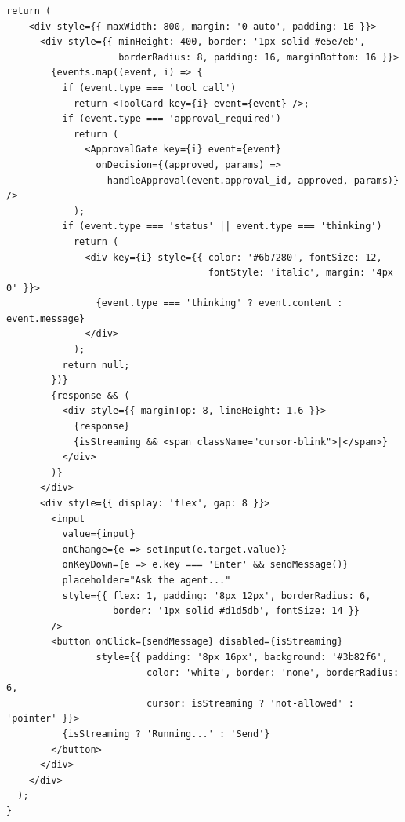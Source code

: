 \begin{lstlisting}[style=pythonstyle, caption={React frontend with streaming tool visualization and approval gates}]
  return (
    <div style={{ maxWidth: 800, margin: '0 auto', padding: 16 }}>
      <div style={{ minHeight: 400, border: '1px solid #e5e7eb',
                    borderRadius: 8, padding: 16, marginBottom: 16 }}>
        {events.map((event, i) => {
          if (event.type === 'tool_call')
            return <ToolCard key={i} event={event} />;
          if (event.type === 'approval_required')
            return (
              <ApprovalGate key={i} event={event}
                onDecision={(approved, params) =>
                  handleApproval(event.approval_id, approved, params)} />
            );
          if (event.type === 'status' || event.type === 'thinking')
            return (
              <div key={i} style={{ color: '#6b7280', fontSize: 12,
                                    fontStyle: 'italic', margin: '4px 0' }}>
                {event.type === 'thinking' ? event.content : event.message}
              </div>
            );
          return null;
        })}
        {response && (
          <div style={{ marginTop: 8, lineHeight: 1.6 }}>
            {response}
            {isStreaming && <span className="cursor-blink">|</span>}
          </div>
        )}
      </div>
      <div style={{ display: 'flex', gap: 8 }}>
        <input
          value={input}
          onChange={e => setInput(e.target.value)}
          onKeyDown={e => e.key === 'Enter' && sendMessage()}
          placeholder="Ask the agent..."
          style={{ flex: 1, padding: '8px 12px', borderRadius: 6,
                   border: '1px solid #d1d5db', fontSize: 14 }}
        />
        <button onClick={sendMessage} disabled={isStreaming}
                style={{ padding: '8px 16px', background: '#3b82f6',
                         color: 'white', border: 'none', borderRadius: 6,
                         cursor: isStreaming ? 'not-allowed' : 'pointer' }}>
          {isStreaming ? 'Running...' : 'Send'}
        </button>
      </div>
    </div>
  );
}
\end{lstlisting}

